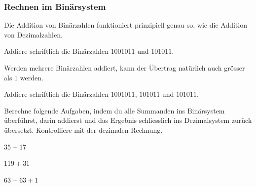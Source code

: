 \documentclass[%
11pt,%
twoside,%
titlepage,%
german,%
headsepline%
]{scrartcl}
\begin{document}
\subsubsection{Rechnen im Binärsystem}
Die Addition von Binärzahlen funktioniert prinzipiell genau so, wie die Addition von Dezimalzahlen.
\begin{ueb}
Addiere schriftlich die Binärzahlen $1001011$ und $101011$.
\end{ueb}
\noindent Werden mehrere Binärzahlen addiert, kann der Übertrag natürlich auch grösser als $1$ werden.
\begin{ueb}
Addiere schriftlich die Binärzahlen $1001011$, $101011$ und $101011$.
\end{ueb}
\begin{ueb}
Berechne folgende Aufgaben, indem du alle Summanden ins Binärsystem überführst, darin addierst und das Ergebnis schliesslich ins Dezimalsystem zurück übersetzt. Kontrolliere mit der dezimalen Rechnung.
\begin{enumeratea}
\item $35+17$
\item $119+31$
\item $63+63+1$
\end{enumeratea}
\end{ueb}
\end{document}
